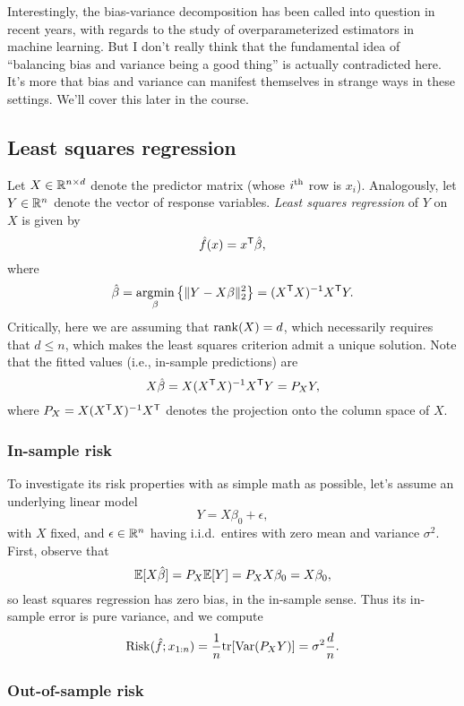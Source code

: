 \documentclass{article}
\begin{document}
Interestingly, the bias-variance decomposition has been called into question in
recent years, with regards to the study of overparameterized estimators in
machine learning. But I don't really think that the fundamental idea of
``balancing bias and variance being a good thing'' is actually contradicted 
here. It's more that bias and variance can manifest themselves in strange ways
in these settings. We'll cover this later in the course. 

\subsection{Least squares regression}

Let $X \in \mathbb{R}^{n \times d}$ denote the predictor matrix (whose $i^{\text{th}}$ row is
$x_i$). Analogously, let $Y \in \mathbb{R}^n$ denote the vector of response
variables. \emph{Least squares regression} of $Y$ on $X$ is given by 
\[
\hat{f}(x) = x^{\mathsf{T}} \hat{\beta},
\]
where 
\[
\hat{\beta} = \mathop{\mathrm{argmin}}_\beta \big\{ \|Y - X\beta\|_2^2 \big\} = (X^{\mathsf{T}} X)^{-1} X^{\mathsf{T}} Y.  
\]
Critically, here we are assuming that $\mathrm{rank}(X) = d$, which necessarily requires
that $d \leq n$, which makes the least squares criterion admit a unique
solution. Note that the fitted values (i.e., in-sample predictions) are 
\[
X\hat{\beta} = X (X^{\mathsf{T}} X)^{-1} X^{\mathsf{T}} Y = P_X Y,
\]
where $P_X = X (X^{\mathsf{T}} X)^{-1} X^{\mathsf{T}} $ denotes the projection onto the column space
of $X$. 

\subsubsection{In-sample risk}

To investigate its risk properties with as simple math as possible, let's assume
an underlying linear model  
\begin{equation}
\label{eq:linear_model}
Y = X\beta_0 + \epsilon,
\end{equation}
with $X$ fixed, and $\epsilon \in \mathbb{R}^n$ having i.i.d.\ entires with zero mean
and variance $\sigma^2$. First, observe that  
\[
\mathbb{E}[X \hat{\beta}] = P_X \mathbb{E}[Y] = P_X X \beta_0 = X \beta_0,
\]
so least squares regression has zero bias, in the in-sample sense. Thus its
in-sample error is pure variance, and we compute 
\begin{equation}
\label{eq:least_squares_in}
\mathrm{Risk}(\hat{f}; x_{1:n}) = \frac{1}{n} \mathrm{tr}[\mathrm{Var}(P_X Y)] = \sigma^2 \frac{d}{n}.
\end{equation}

\subsubsection{Out-of-sample risk}
\end{document}
